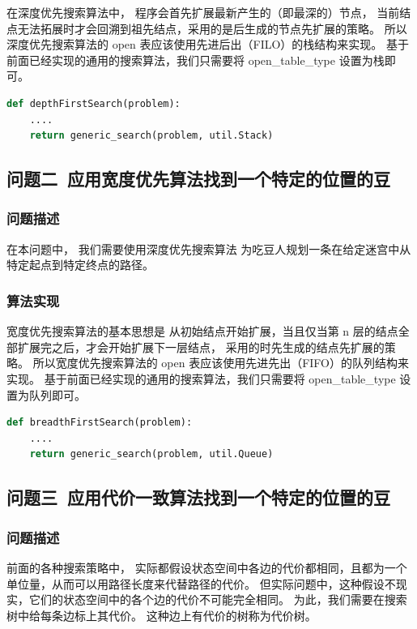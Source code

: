 \documentclass[12pt,onecolumn]{report}
\theoremstyle{plain}
\numberwithin{figure}{section}
\begin{document}
在深度优先搜索算法中，
程序会首先扩展最新产生的（即最深的）节点，
当前结点无法拓展时才会回溯到祖先结点，采用的是后生成的节点先扩展的策略。
所以深度优先搜索算法的 open 表应该使用先进后出（FILO）的栈结构来实现。
基于前面已经实现的通用的搜索算法，我们只需要将 open\_table\_type 设置为栈即可。

\begin{lstlisting}[language=python]
def depthFirstSearch(problem):
    ....
    return generic_search(problem, util.Stack)
\end{lstlisting}

\subsection{问题二~应用宽度优先算法找到一个特定的位置的豆}
\subsubsection{问题描述}
在本问题中，
我们需要使用深度优先搜索算法
为吃豆人规划一条在给定迷宫中从特定起点到特定终点的路径。

\subsubsection{算法实现}
宽度优先搜索算法的基本思想是
从初始结点开始扩展，当且仅当第 n 层的结点全部扩展完之后，才会开始扩展下一层结点，
采用的时先生成的结点先扩展的策略。
所以宽度优先搜索算法的 open 表应该使用先进先出（FIFO）的队列结构来实现。
基于前面已经实现的通用的搜索算法，我们只需要将 open\_table\_type 设置为队列即可。

\begin{lstlisting}[language=python]
def breadthFirstSearch(problem):
    ....
    return generic_search(problem, util.Queue)
\end{lstlisting}

\subsection{问题三~应用代价一致算法找到一个特定的位置的豆}
\subsubsection{问题描述}
前面的各种搜索策略中，
实际都假设状态空间中各边的代价都相同，且都为一个单位量，从而可以用路径长度来代替路径的代价。
但实际问题中，这种假设不现实，它们的状态空间中的各个边的代价不可能完全相同。
为此，我们需要在搜索树中给每条边标上其代价。
这种边上有代价的树称为代价树。
\end{document}
